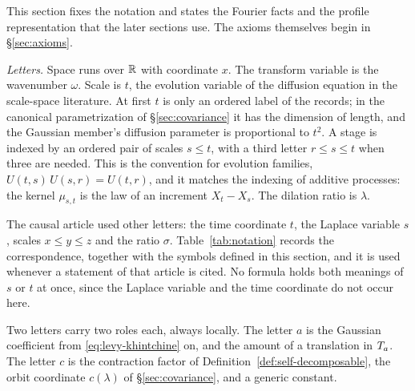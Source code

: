 This section fixes the notation and states the Fourier facts and the profile representation
that the later sections use. The axioms themselves begin in \S\ref{sec:axioms}.

\emph{Letters.} Space runs over $\mathbb{R}$ with coordinate $x$. The transform variable is the
wavenumber $\omega$. Scale is $t$, the evolution variable of the diffusion equation in the
scale-space literature. At first $t$ is only an ordered label of the records; in the
canonical parametrization of \S\ref{sec:covariance} it has the dimension of length, and the
Gaussian member's diffusion parameter is proportional to $t^2$. A stage is indexed by an ordered pair of scales $s \le t$, with a
third letter $r \le s \le t$ when three are needed. This is the convention for evolution
families, $U(t,s)\,U(s,r) = U(t,r)$, and it matches the indexing of additive processes: the
kernel $\mu_{s,t}$ is the law of an increment $X_t - X_s$. The dilation ratio is $\lambda$.

The causal article  used other letters: the time coordinate
$t$, the Laplace variable $s$, scales $x \le y \le z$ and the ratio $\sigma$.
Table~\ref{tab:notation} records the correspondence, together with the symbols defined in
this section, and it is used whenever a statement of that article is cited. No formula holds
both meanings of $s$ or $t$ at once, since the Laplace variable and the time coordinate do
not occur here.

Two letters carry two roles each, always locally. The letter $a$ is the Gaussian coefficient
from \ref{eq:levy-khintchine} on, and the amount of a translation in $T_{a}$. The letter
$c$ is the contraction factor of Definition~\ref{def:self-decomposable}, the orbit coordinate
$c(\lambda)$ of \S\ref{sec:covariance}, and a generic constant.

